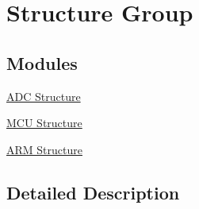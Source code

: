 \hypertarget{group___strc_grp}{\section{Structure Group}
\label{group___strc_grp}
}
\subsection*{Modules}
\begin{DoxyCompactItemize}
\item 
\hyperlink{group___adc_strc}{A\-D\-C Structure}
\item 
\hyperlink{group___mcu_strc}{M\-C\-U Structure}
\item 
\hyperlink{group___arm_strc}{A\-R\-M Structure}
\end{DoxyCompactItemize}


\subsection{Detailed Description}

